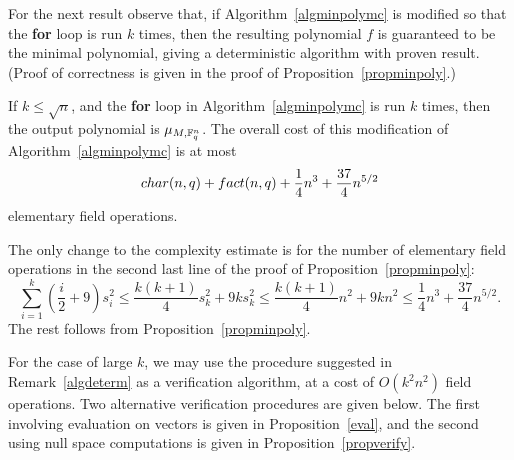 For the next result observe that, if Algorithm~\ref{algminpolymc} 
is modified so that the {\bf for} loop is run $k$ times, then the resulting 
polynomial $f$ is guaranteed to be the minimal polynomial, giving a deterministic
algorithm with proven result. (Proof of correctness 
is given in the proof of Proposition~\ref{propminpoly}.)

\begin{Prop}
\label{veryfewvectors}
If $k \le \sqrt{n}$,  and the {\bf for} loop in 
Algorithm~\ref{algminpolymc} is run $k$ times, then the output polynomial
is $\mu_{M,\mathbb{F}_q^n}$. The 
overall cost of this modification of Algorithm~\ref{algminpolymc} is at most
\[ {\rm char}(n,q) + {\rm fact}(n,q) + \frac{1}{4}n^3+\frac{37}{4} n^{5/2} \]
elementary field operations.
\end{Prop}
\proofbeg The only change 
to the complexity estimate is for the number of elementary field operations 
in the second last line of the proof of Proposition~\ref{propminpoly}:
\[
\sum_{i=1}^k(\frac{i}{2}+9)s_i^2 \leq \frac{k(k+1)}{4}s_k^2+9ks_k^2
\leq \frac{k(k+1)}{4}n^2+9kn^2\le \frac{1}{4}n^3+\frac{37}{4} n^{5/2}.
\]
The rest follows from Proposition~\ref{propminpoly}.
\proofend

\medskip
For the case of large $k$, we may use the procedure suggested in
Remark~\ref{algdeterm} as a verification algorithm, at a cost of
$O(k^2n^2)$ field operations. Two alternative verification procedures
%
are given below. The first involving evaluation on vectors is given in
Proposition~\ref{eval}, and the second using null space computations is
given in Proposition~\ref{propverify}.


